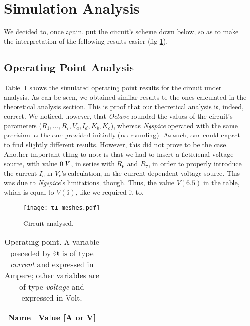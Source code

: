 \section{Simulation Analysis}
\label{sec:simulation}

We decided to, once again, put the circuit's scheme down below, so as to make the interpretation of the following results easier (fig \ref{fig:op}).

\subsection{Operating Point Analysis}

Table~\ref{tab:op} shows the simulated operating point results for the circuit
under analysis. As can be seen, we obtained similar results to the ones calculated in the theoretical analysis section. This is proof that our theoretical analysis is, indeed, correct.
We noticed, however, that \emph{Octave} rounded the values of the circuit's parameters ($R_{1}, ..., R_{7}, V_{a}, I_{d}, K_{b}, K_{c}$), whereas \emph{Ngspice} operated with the same precision as the one provided initially (no rounding).
As such, one could expect to find slightly different results. However, this did not prove to be the case. Another important thing to note is that we had to insert a fictitional
voltage source, with value $0\hspace{1mm}V$, in series with $R_{6}$ and $R_{7}$, in order to properly introduce the current $I_{c}$ in $V_{c}$'s calculation, in the current dependent
voltage source. This was due to \emph{Ngspice}'s limitations, though. Thus,
the value $V(6.5)$ in the table, which is equal to $V(6)$, like we required it to.

\begin{figure}[h] \centering
  \texttt{[image: t1\_meshes.pdf]}
  \caption{Circuit analysed.}
  \label{fig:op}
\end{figure}

\begin{table}[h]
  \centering
  \begin{tabular}{|l|r|}
    \hline    
    {\bf Name} & {\bf Value [A or V]} \\ \hline
    
  \end{tabular}
  \caption{Operating point. A variable preceded by @ is of type {\em current}
    and expressed in Ampere; other variables are of type {\it voltage} and expressed in
    Volt.}
  \label{tab:op}
\end{table}
\newpage



